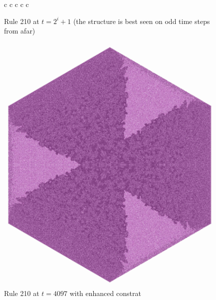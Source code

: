 \documentclass{article}
\begin{document}
\begin{figure}[H]
\begin{tblr}{c c c c c}
    \end{tblr}
    \caption{Rule 210 at $t=2^i +1$ (the structure is best seen on odd time steps from afar)}
    \label{tab:rule-210-evolution}
\end{figure}

\begin{figure}[H]
    \centering
    \includegraphics[width=.85\textwidth]{graphics/behavior/rule-210/rule-210-time-4097-contrast.jpg}
    \caption{Rule 210 at $t=4097$ with enhanced constrat}
    \label{fig:rule-210-time-4097}
\end{figure}
\end{document}
